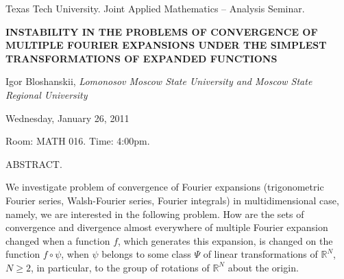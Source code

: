 \documentclass[oneside]{amsart}
\newcommand{\talktitle}{Instability in the Problems of Convergence of Multiple Fourier Expansions Under the Simplest Transformations of Expanded Functions}
\newcommand{\talkspeaker}{{\sc Igor Bloshanskii}, \textit{Lomonosov Moscow State University and Moscow State Regional University}}
\newcommand{\talkdate}{Wednesday, January 26, 2011}
\newcommand{\talkabstract}{
We investigate problem of convergence of Fourier expansions
(trigonometric Fourier series, Walsh-Fourier series, Fourier integrals) in multidimensional
case, namely, we are interested in the following problem. How
are the sets of convergence and divergence almost everywhere of multiple
Fourier expansion changed when a function $f$, which generates this expansion,
is changed on the function $f\circ \psi$, when $\psi$ belongs to some class $\Psi$ of
linear transformations of $\mathbb R^N$, $N\ge 2$, in particular, to the group of rotations
of $\mathbb R^N$ about the origin.
}
\begin{document}
\thispagestyle{empty}

\begin{center}
Texas Tech University.  Joint Applied Mathematics -- Analysis Seminar.

\end{center}

\begin{center}

\textbf{\LARGE {\uppercase{\talktitle}} }

\talkspeaker

\talkdate

Room: MATH 016.  Time: 4:00pm.

\end{center}

ABSTRACT.
\talkabstract
\end{document}
